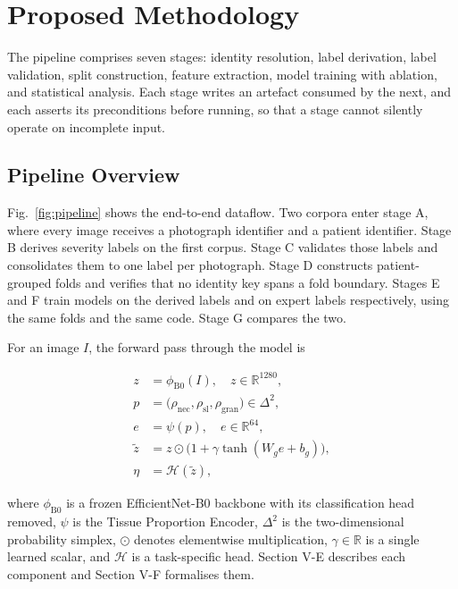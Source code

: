 \section{Proposed Methodology}

The pipeline comprises seven stages: identity resolution, label derivation,
label validation, split construction, feature extraction, model training
with ablation, and statistical analysis. Each stage writes an artefact
consumed by the next, and each asserts its preconditions before running, so
that a stage cannot silently operate on incomplete input.

\subsection{Pipeline Overview}

Fig.~\ref{fig:pipeline} shows the end-to-end dataflow. Two corpora enter
stage A, where every image receives a photograph identifier and a patient
identifier. Stage B derives severity labels on the first corpus. Stage C
validates those labels and consolidates them to one label per photograph.
Stage D constructs patient-grouped folds and verifies that no identity key
spans a fold boundary. Stages E and F train models on the derived labels
and on expert labels respectively, using the same folds and the same code.
Stage G compares the two.

For an image $I$, the forward pass through the model is

\begin{equation}
\begin{aligned}
z    &= \phi_{\text{B0}}(I), \quad z \in \mathbb{R}^{1280}, \\
p    &= \big(\rho_{\text{nec}}, \rho_{\text{sl}}, \rho_{\text{gran}}\big)
        \in \Delta^{2}, \\
e    &= \psi(p), \quad e \in \mathbb{R}^{64}, \\
\tilde{z} &= z \odot \big(1 + \gamma \tanh(W_g e + b_g)\big), \\
\eta &= \mathcal{H}(\tilde{z}),
\end{aligned}
\label{eq:forward}
\end{equation}

where $\phi_{\text{B0}}$ is a frozen EfficientNet-B0 backbone \cite{tan2019} with its
classification head removed, $\psi$ is the Tissue Proportion Encoder,
$\Delta^{2}$ is the two-dimensional probability simplex, $\odot$ denotes
elementwise multiplication, $\gamma \in \mathbb{R}$ is a single learned
scalar, and $\mathcal{H}$ is a task-specific head. Section V-E describes
each component and Section V-F formalises them.

